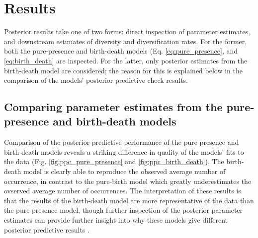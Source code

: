 \documentclass[12pt,letterpaper]{article}
\begin{document}
\section*{Results}

Posterior results take one of two forms: direct inspection of parameter estimates, and downstream estimates of diversity and diversification rates. For the former, both the pure-presence and birth-death models (Eq. \ref{eq:pure_presence}, and \ref{eq:birth_death} are inspected. For the latter, only posterior estimates from the birth-death model are considered; the reason for this is explained below in the comparison of the models' posterior predictive check results.

\subsection*{Comparing parameter estimates from the pure-presence and birth-death models}


Comparison of the posterior predictive performance of the pure-presence and birth-death models reveals a striking difference in quality of the models' fits to the data (Fig. \ref{fig:ppc_pure_presence} and \ref{fig:ppc_birth_death}). The birth-death model is clearly able to reproduce the observed average number of occurrence, in contrast to the pure-birth model which greatly underestimates the ovserved average number of occurrences. The interpretation of these results is that the results of the birth-death model are more representative of the data than the pure-presence model, though further inspection of the posterior parameter estimates can provide further insight into why these models give different posterior predictive results \citep{Gelman2013d}.
\end{document}
